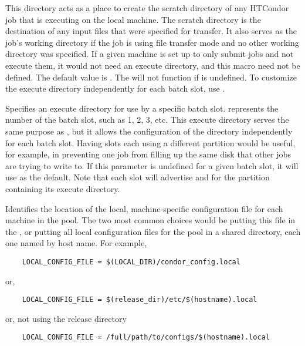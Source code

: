 \begin{description}
\label{param:Execute}
\item[\Macro{EXECUTE}]
  This directory acts as
  a place to create the scratch directory of any HTCondor job that is executing
  on
  the local machine.  The scratch directory is the destination of
  any input files that were specified for transfer.  It also serves
  as the job's working directory if the job is using file transfer
  mode and no other working directory was specified.
  If a given machine is set up to only submit
  jobs and not execute them, it would not need an execute directory,
  and this macro need not be defined.
  The default value is .
  The  will not function if
   is undefined.
  To customize the execute
  directory independently for each batch slot, use .

\label{param:SlotNExecute}
\item[\Macro{SLOT<N>\_EXECUTE}]
  Specifies an
  execute directory for use by a specific batch slot.
   represents the number of the batch slot, such as 1, 2, 3, etc.
  This execute directory serves the same purpose as , but it
  allows the configuration of the directory independently for each batch
  slot.  Having slots each using a different partition would be
  useful, for example, in preventing one job from filling up the same
  disk that other jobs are trying to write to.  If this parameter is
  undefined for a given batch slot, it will use  as
  the default.  Note that each slot will advertise 
  and  for the partition containing its execute
  directory.

\label{param:LocalConfigFile}
\item[\Macro{LOCAL\_CONFIG\_FILE}]
  Identifies the
  location of the local, machine-specific configuration
  file for each machine
  in the pool.  The two most common choices would be putting this
  file in the , or putting all
  local configuration files for the pool in a shared directory, each one
  named by host name.  For example,
  \begin{verbatim}
    LOCAL_CONFIG_FILE = $(LOCAL_DIR)/condor_config.local
  \end{verbatim}
  or,
  \begin{verbatim}
    LOCAL_CONFIG_FILE = $(release_dir)/etc/$(hostname).local
  \end{verbatim}
  or, not using the release directory
  \begin{verbatim}
    LOCAL_CONFIG_FILE = /full/path/to/configs/$(hostname).local
  \end{verbatim}
  

\end{description}
